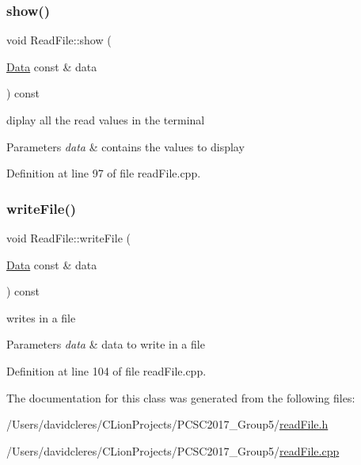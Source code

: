 \subsubsection{\texorpdfstring{show()}{show()}}
{\footnotesize\ttfamily void Read\+File\+::show (\begin{DoxyParamCaption}\item[{\mbox{\hyperlink{struct_data}{Data}} const \&}]{data }\end{DoxyParamCaption}) const}



diplay all the read values in the terminal 


\begin{DoxyParams}{Parameters}
{\em data} & contains the values to display \\
\hline
\end{DoxyParams}


Definition at line 97 of file read\+File.\+cpp.

\mbox{\label{class_read_file_ab66909fd861779f01fde0e11aef0b77b}} 
\subsubsection{\texorpdfstring{write\+File()}{writeFile()}}
{\footnotesize\ttfamily void Read\+File\+::write\+File (\begin{DoxyParamCaption}\item[{\mbox{\hyperlink{struct_data}{Data}} const \&}]{data }\end{DoxyParamCaption}) const}



writes in a file 


\begin{DoxyParams}{Parameters}
{\em data} & data to write in a file \\
\hline
\end{DoxyParams}


Definition at line 104 of file read\+File.\+cpp.



The documentation for this class was generated from the following files\+:\begin{DoxyCompactItemize}
\item 
/\+Users/davidcleres/\+C\+Lion\+Projects/\+P\+C\+S\+C2017\+\_\+\+Group5/\mbox{\hyperlink{read_file_8h}{read\+File.\+h}}\item 
/\+Users/davidcleres/\+C\+Lion\+Projects/\+P\+C\+S\+C2017\+\_\+\+Group5/\mbox{\hyperlink{read_file_8cpp}{read\+File.\+cpp}}\end{DoxyCompactItemize}
